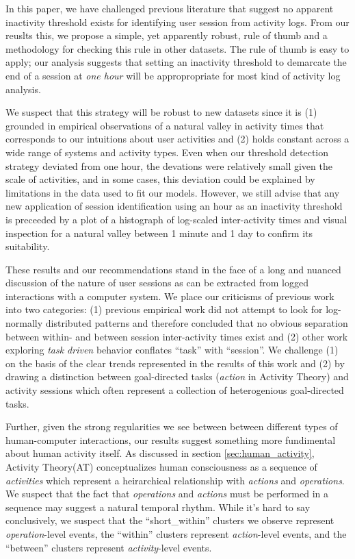 In this paper, we have challenged previous literature that suggest no apparent inactivity threshold exists for identifying user session from activity logs.  From our reuslts this, we propose a simple, yet apparently robust, rule of thumb and a methodology for checking this rule in other datasets.  The rule of thumb is easy to apply; our analysis suggests that setting an inactivity threshold to demarcate the end of a session at \emph{one hour} will be appropropriate for most kind of activity log analysis.

We suspect that this strategy will be robust to new datasets since it is (1) grounded in empirical observations of a natural valley in activity times that corresponds to our intuitions about user activities and (2) holds constant across a wide range of systems and activity types. Even when our threshold detection strategy deviated from one hour, the devations were relatively small given the scale of activities, and in some cases, this deviation could be explained by limitations in the data used to fit our models.  However, we still advise that any new application of session identification using an hour as an inactivity threshold is preceeded by a plot of a histograph of log-scaled inter-activity times and visual inspection for a natural valley between 1 minute and 1 day to confirm its suitability.

These results and our recommendations stand in the face of a long and nuanced discussion of the nature of user sessions as can be extracted from logged interactions with a computer system.  We place our criticisms of previous work into two categories: (1) previous empirical work did not attempt to look for log-normally distributed patterns and therefore concluded that no obvious separation between within- and between session inter-activity times exist\cite{something} and (2) other work exploring \emph{task driven} behavior conflates ``task'' with ``session''.  We challenge (1) on the basis of the clear trends represented in the results of this work and (2) by drawing a distinction between goal-directed tasks (\emph{action} in Activity Theory) and activity sessions which often represent a collection of heterogenious goal-directed tasks.

Further, given the strong regularities we see between between different types of human-computer interactions, our results suggest something more fundimental about human activity itself.  As discussed in section \ref{sec:human_activity}, Activity Theory(AT) conceptualizes human consciousness as a sequence of \emph{activities} which represent a heirarchical relationship with \emph{actions} and \emph{operations}.  We suspect that the fact that \emph{operations} and \emph{actions} must be performed in a sequence may suggest a natural temporal rhythm.  While it's hard to say conclusively, we suspect that the ``short\_within'' clusters we observe represent \emph{operation}-level events, the ``within'' clusters represent \emph{action}-level events, and the ``between'' clusters represent \emph{activity}-level events.

